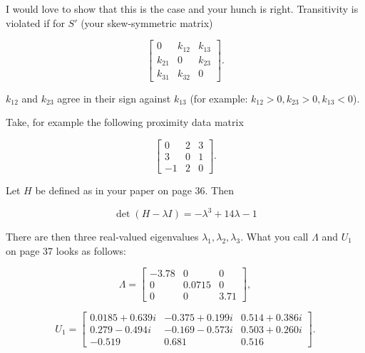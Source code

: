\documentclass[landscape,10pt]{article}
\begin{document}
I would love to show that this is the case and your hunch is right.
Transitivity is violated if for $S'$ (your skew-symmetric matrix)

\begin{equation}
  \label{eq:e6}
      \left[
      \begin{array}{ccc}
        0 & k_{12} & k_{13} \\
        k_{21} & 0 & k_{23} \\
        k_{31} & k_{32} & 0 
      \end{array}
\right].
\end{equation}

$k_{12}$ and $k_{23}$ agree in their sign against $k_{13}$ (for
example: $k_{12}>0,k_{23}>0,k_{13}<0$). 

Take, for example the following proximity data matrix

\begin{equation}
  \label{eq:e7}
      \left[
      \begin{array}{ccc}
        0 & 2 & 3 \\
        3 & 0 & 1 \\
        -1 & 2 & 0 
      \end{array}
\right].
\end{equation}

Let $H$ be defined as in your paper on page 36. Then

\begin{equation}
  \label{eq:e8}
  \det(H-\lambda{}I)=-\lambda^{3}+14\lambda-1
\end{equation}

There are then three real-valued eigenvalues
$\lambda_{1},\lambda_{2},\lambda_{3}$. What you call $\Lambda$ and
$U_{1}$ on page 37 looks as follows:

\begin{equation}
  \label{eq:e72}
\Lambda=
      \left[
      \begin{array}{ccc}
  -3.78 & 0 & 0 \\
  0 & 0.0715 & 0 \\
  0 & 0 & 3.71
      \end{array}
\right],
\end{equation}

\begin{equation}
  \label{eq:e71}
U_{1}=
      \left[
      \begin{array}{ccc}
   0.0185 + 0.639i & -0.375 + 0.199i &  0.514 + 0.386i \\
   0.279 - 0.494i & -0.169 - 0.573i &  0.503 + 0.260i \\
  -0.519 & 0.681 & 0.516
      \end{array}
\right].
\end{equation}
\end{document}
